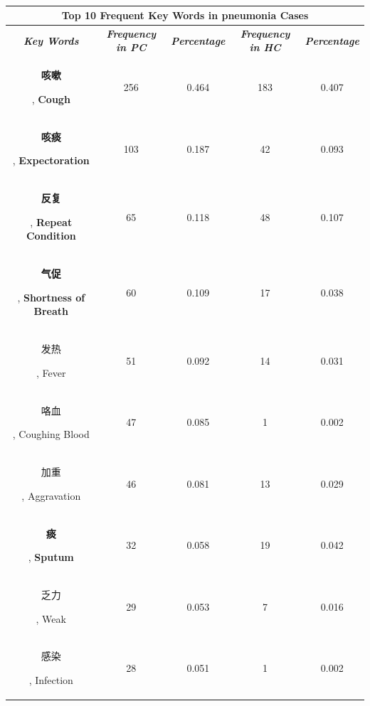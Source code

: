 \documentclass[journal]{IEEEtran}
\begin{document}
\begin{table}[htb]
    \vspace{-0cm}
\caption{}
\vspace{-0cm}
\begin{center}
\begin{tabular}{c|c|c|c|c}
\multicolumn{5}{c}{\textbf{Top 10 Frequent Key Words in pneumonia Cases}} \\
\hline
    \textbf{\textit{Key Words}} & \textbf{\textit{Frequency in PC}} & \textbf{\textit{Percentage}}& \textbf{\textit{Frequency in HC}}& \textbf{\textit{Percentage}} \\
\hline
\begin{CJK}{UTF8}{gbsn}\textbf{咳嗽}\end{CJK}, \textbf{Cough} & 256 & 0.464 & 183 & 0.407\\
\begin{CJK}{UTF8}{gbsn}\textbf{咳痰}\end{CJK}, \textbf{Expectoration} & 103 & 0.187 & 42 & 0.093\\
\begin{CJK}{UTF8}{gbsn}\textbf{反复}\end{CJK}, \textbf{Repeat Condition} & 65 & 0.118 & 48 & 0.107\\
\begin{CJK}{UTF8}{gbsn}\textbf{气促}\end{CJK}, \textbf{Shortness of Breath} & 60 & 0.109 & 17 & 0.038\\
\begin{CJK}{UTF8}{gbsn}发热\end{CJK}, Fever & 51 & 0.092 & 14 & 0.031\\
\begin{CJK}{UTF8}{gbsn}咯血\end{CJK}, Coughing Blood & 47 & 0.085 & 1 & 0.002\\
\begin{CJK}{UTF8}{gbsn}加重\end{CJK}, Aggravation & 46 & 0.081 & 13 & 0.029\\
\begin{CJK}{UTF8}{gbsn}\textbf{痰}\end{CJK}, \textbf{Sputum} & 32 & 0.058 & 19 & 0.042\\
\begin{CJK}{UTF8}{gbsn}乏力\end{CJK}, Weak& 29 & 0.053 & 7 & 0.016\\
\begin{CJK}{UTF8}{gbsn}感染\end{CJK}, Infection& 28 & 0.051 & 1 & 0.002\\



\end{tabular}
\end{center}
\end{table}
\end{document}
